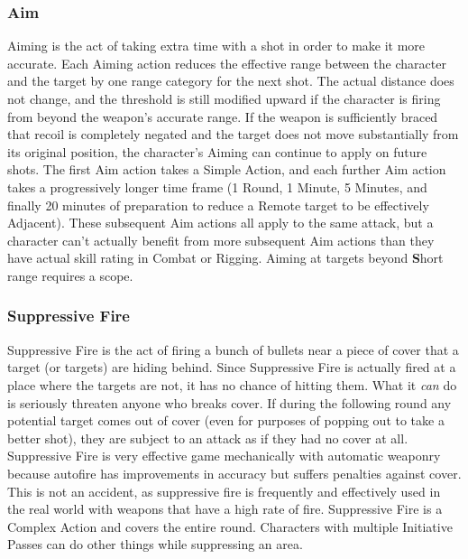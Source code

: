 \subsubsection{Aim}\hspace{\parindent}  Aiming is the act of taking extra time with a shot in order to make it more accurate. Each Aiming action reduces the effective range between the character and the target by one range category for the next shot. The actual distance does not change, and the threshold is still modified upward if the character is firing from beyond the weapon's accurate range. If the weapon is sufficiently braced that recoil is completely negated and the target does not move substantially from its original position, the character's Aiming can continue to apply on future shots. The first Aim action takes a Simple Action, and each further Aim action takes a progressively longer time frame (1 Round, 1 Minute, 5 Minutes, and finally 20 minutes of preparation to reduce a Remote target to be effectively Adjacent). These subsequent Aim actions all apply to the same attack, but a character can't actually benefit from more subsequent Aim actions than they have actual skill rating in Combat or Rigging. Aiming at targets beyond \textbf{S}hort range requires a scope.

\subsubsection{Suppressive Fire}\hspace{\parindent}  Suppressive Fire is the act of firing a bunch of bullets near a piece of cover that a target (or targets) are hiding behind. Since Suppressive Fire is actually fired at a place where the targets are not, it has no chance of hitting them. What it \textit{can} do is seriously threaten anyone who breaks cover. If during the following round any potential target comes out of cover (even for purposes of popping out to take a better shot), they are subject to an attack as if they had no cover at all. Suppressive Fire is very effective game mechanically with automatic weaponry because autofire has improvements in accuracy but suffers penalties against cover. This is not an accident, as suppressive fire is frequently and effectively used in the real world with weapons that have a high rate of fire. Suppressive Fire is a Complex Action and covers the entire round. Characters with multiple Initiative Passes can do other things while suppressing an area.


